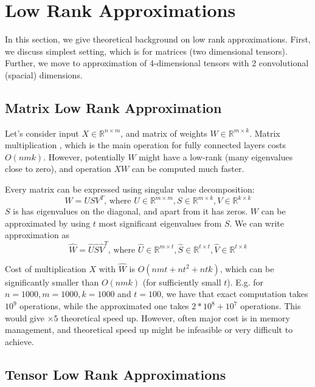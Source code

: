 \documentclass{article}
\begin{document}
\section{Low Rank Approximations}
In this section, we give theoretical background on low rank approximations. First, we discuss simplest setting, which is
for matrices (two dimensional tensors). Further, we move to approximation of 4-dimensional tensors with 2 convolutional (spacial)
dimensions.


\subsection{Matrix Low Rank Approximation}
Let's consider input $X \in \mathbb{R}^{n \times m}$, and matrix of weights $W \in \mathbb{R}^{m \times k}$. Matrix multiplication
, which is the main operation for fully connected layers costs $O(nmk)$. However, potentially $W$ might have a low-rank (many 
eigenvalues close to zero), and operation $XW$ can be computed much faster. 


Every matrix can be expressed using singular value decomposition:
\begin{equation*}
	W = USV^T\text{, where }U \in \mathbb{R}^{m \times m}, S \in \mathbb{R}^{m \times k}, V \in \mathbb{R}^{k \times k}
\end{equation*}
$S$ is has eigenvalues on the diagonal, and apart from it has zeros. $W$ can be approximated by using $t$ most significant
eigenvalues from $S$. We can write approximation as
\begin{equation*}
	\hat{W} = \hat{U}\hat{S}\hat{V}^T\text{, where }\hat{U} \in \mathbb{R}^{m \times t}, \hat{S} \in \mathbb{R}^{t \times t}, \hat{V} \in \mathbb{R}^{t \times k}
\end{equation*}

Cost of multiplication $X$ with $\hat{W}$ is $O(nmt + nt^2 + ntk)$, which can be significantly smaller than $O(nmk)$ (for sufficiently small $t$). E.g.
for $n = 1000, m = 1000, k = 1000$ and $t = 100$, we have that exact computation takes $10^9$ operations, while the approximated one takes
$2 * 10^8 + 10^7$ operations. This would give $\times 5$ theoretical speed up. However, often major cost is in memory management, 
and theoretical speed up might be infeasible or very difficult to achieve. 


\subsection{Tensor Low Rank Approximations}
\end{document}
